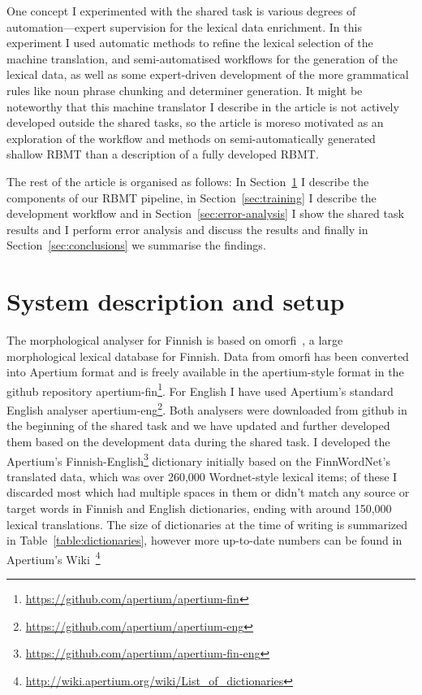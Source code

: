 \documentclass[free]{flammie}
\begin{document}
One concept I experimented with the shared task is various degrees of
automation---expert supervision for the lexical data enrichment. In this
experiment I used automatic methods to refine the lexical selection of the
machine translation, and semi-automatised workflows for the generation
of the lexical data, as well as some expert-driven development of the more
grammatical rules like noun phrase chunking and determiner generation.
It might be noteworthy that this machine translator I describe in the
article is not actively developed outside the shared tasks,
so the article is moreso motivated as
an exploration of the workflow and methods on semi-automatically generated
shallow RBMT than a description of a fully developed RBMT.\@


The rest of the article is organised as follows: In Section~\ref{sec:data}
I describe the components of our RBMT pipeline, in Section~\ref{sec:training}
I describe the development workflow and in Section~\ref{sec:error-analysis} I show
the shared task results and I perform error
analysis and discuss the results and finally in Section~\ref{sec:conclusions} we
summarise the findings.

\section{System description and setup}
\label{sec:data}

The morphological analyser for Finnish is based on omorfi~\cite{omorfi}, a large
morphological lexical database for Finnish. Data from omorfi has been converted
into Apertium format and is freely available in the apertium-style format in the
github repository
apertium-fin\footnote{\url{https://github.com/apertium/apertium-fin}}. For
English I have used Apertium's standard English analyser
apertium-eng\footnote{\url{https://github.com/apertium/apertium-eng}}. Both
analysers were downloaded from github in the beginning of the shared task and we
have updated and further developed them based on the development data during the
shared task. I developed the  Apertium's Finnish-English\footnote{\url{https://github.com/apertium/apertium-fin-eng}} dictionary initially
based on the FinnWordNet's translated data, which was over 260,000 Wordnet-style
lexical items; of these I discarded most which had multiple spaces in them or
didn't match any source or target words in Finnish and English dictionaries,
ending with around 150,000 lexical translations.  The size of dictionaries at
the time of writing is summarized in Table~\ref{table:dictionaries}, however
more up-to-date numbers can be found in Apertium's
Wiki~\footnote{\url{http://wiki.apertium.org/wiki/List_of_dictionaries}}
\end{document}
